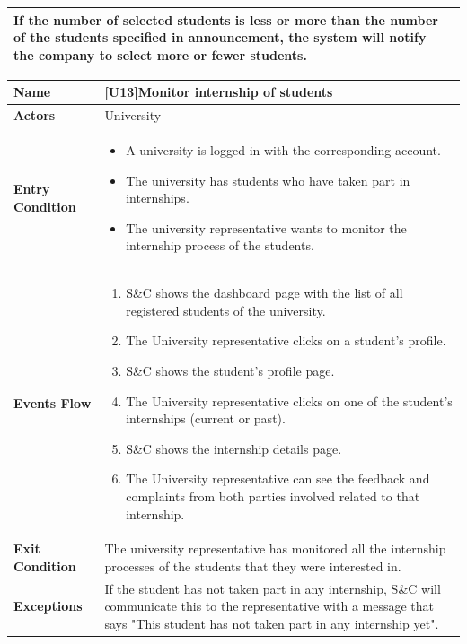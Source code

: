 \begin{center}
\begin{tabular}{|p{9em}|p{27em}|}
         If the number of selected students is less or more than the number of the students specified in announcement, the system will notify the company to 
         select more or fewer students.\\
        \hline
    \end{tabular}
\end{center}

\begin{center}
    \begin{tabular}{|p{9em}|p{27em}|}
        \hline
        \rowcolor{bluepoli!40} %
        \textbf{Name} & \textbf{[U13]Monitor internship of students} \\
        \hline
        \textbf{Actors} & University \\
        \hline
        \textbf{Entry Condition} & 
        \begin{itemize}
            \item A university is logged in with the corresponding account.
            \item The university has students who have taken part in internships.
            \item The university representative wants to monitor the internship process of the students.
        \end{itemize} \\
        \hline
        \textbf{Events Flow} & 
        \begin{enumerate}
            \item S\&C shows the dashboard page with the list of all registered students of the university.
            \item The University representative clicks on a student's profile.
            \item S\&C shows the student's profile page.
            \item The University representative clicks on one of the student's internships (current or past).
            \item S\&C shows the internship details page.
            \item The University representative can see the feedback and complaints from both parties involved related to that internship.
        \end{enumerate} \\
        \hline
        \textbf{Exit Condition} & The university representative has monitored all the internship processes of the students that they were
        interested in. \\
        \hline
        \textbf{Exceptions} & If the student has not taken part in any internship, S\&C will communicate this to the representative with a 
        message that says "This student has not taken part in any internship yet". \\
        \hline
    \end{tabular}
\end{center}


